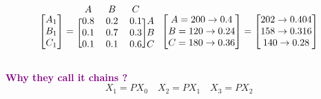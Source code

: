 \documentclass[letterpaper, 10.5pt,landscape]{article}
\begin{document}
\begin{multicols*}{3}
\vspace{-5pt}
\[ \begin{bmatrix}
A_{1} \\
B_{1} \\
C_{1}
\end{bmatrix} = 
\begin{blockarray}{cccc}
A & B & C \\
\begin{block}{[ccc]c}
  0.8 & 0.2 & 0.1 & \hspace{-7pt}A \\
  0.1 & 0.7 & 0.3 & \hspace{-7pt}B \\
  0.1 & 0.1 & 0.6 & \hspace{-7pt}C \\
\end{block}
\end{blockarray}
\begin{bmatrix}
A = 200 \rightarrow 0.4 \\
B = 120 \rightarrow 0.24\\
C = 180 \rightarrow 0.36
\end{bmatrix}
=  \begin{bmatrix}
202 \rightarrow 0.404 \\
158 \rightarrow 0.316 \\
140 \rightarrow 0.28
\end{bmatrix}
\]



\textcolor{purple}{\textbf{Why they call it chains
?}}
\vspace{-3pt}
\[X_{1} = PX_{0} \quad X_{2} = PX_{1} \quad X_{3} = PX_{2} \]


\end{multicols*}
\end{document}

